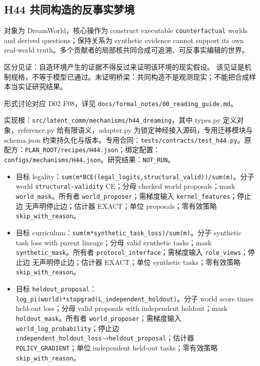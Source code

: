 \documentclass[
  10pt,
]{article}
\begin{document}
\subsection{H44
共同构造的反事实梦境}\label{h44-ux5171ux540cux6784ux9020ux7684ux53cdux4e8bux5b9eux68a6ux5883}

对象为 DreamWorld，核心操作为 construct executable
\nolinkurl{counterfactual} worlds and derived questions；保持关系为
synthetic evidence cannot support its own real-world
truth。多个贡献者的局部核共同合成可追溯、可反事实编辑的世界。

区分见证：自造环境产生的证据不得反过来证明该环境的现实假设。
该见证是机制规格，不等于模型已通过。未证明桥梁：共同构造不是观测现实；不能把合成样本当实证研究结果。

形式讨论对应 D02 F08，详见
{\small\nolinkurl{docs/formal_notes/00_reading_guide.md}}。

实现根：{\small\nolinkurl{src/latent_comm/mechanisms/h44_dreaming}}，其中
types.py 定义对象，reference.py 给有限语义，adapter.py
为锁定神经接入源码，专用迁移模块与 schema.json
约束持久化与版本。专用合同：{\small\nolinkurl{tests/contracts/test_h44.py}}。原配方：{\small\nolinkurl{PLAN_ROOT/recipes/H44.json}}；绑定配置：{\small\nolinkurl{configs/mechanisms/H44.json}}。研究结果：\nolinkurl{NOT_RUN}。

\begin{itemize}
\item
  目标
  legality：{\small\nolinkurl{sum(m*BCE(legal_logits,structural_valid))/sum(m)}}。分子
  world \nolinkurl{structural-validity} CE；分母 checked world
  proposals；mask \nolinkurl{world_mask}。所有者
  \nolinkurl{world_proposer}；需梯度输入
  \nolinkurl{kernel_features}；停止边 无声明停止边；估计器 EXACT；单位
  proposals；零有效策略 \nolinkurl{skip_with_reason}。
\item
  目标
  curriculum：{\small\nolinkurl{sum(m*synthetic_task_loss)/sum(m)}}。分子
  synthetic task loss with parent lineage；分母 valid synthetic
  tasks；mask \nolinkurl{synthetic_mask}。所有者
  \nolinkurl{protocol_interface}；需梯度输入
  \nolinkurl{role_views}；停止边 无声明停止边；估计器 EXACT；单位
  synthetic tasks；零有效策略 \nolinkurl{skip_with_reason}。
\item
  目标
  \nolinkurl{heldout_proposal}：{\small\nolinkurl{log_pi(world)*stopgrad(L_independent_holdout)}}。分子
  world score times held-out loss；分母 valid proposals with independent
  holdout；mask \nolinkurl{holdout_mask}。所有者
  \nolinkurl{world_proposer}；需梯度输入
  \nolinkurl{world_log_probability}；停止边
  \nolinkurl{independent_holdout_loss}→\nolinkurl{heldout_proposal}；估计器
  \nolinkurl{POLICY_GRADIENT}；单位 independent held-out
  tasks；零有效策略 \nolinkurl{skip_with_reason}。
\end{itemize}
\end{document}

